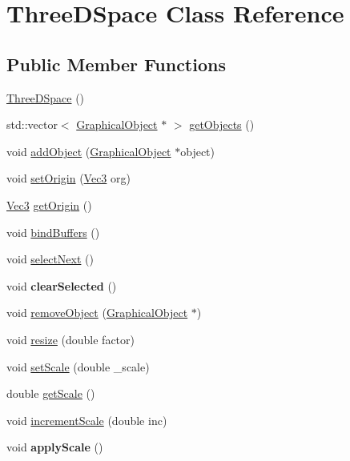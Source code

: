 \hypertarget{classThreeDSpace}{
\section{ThreeDSpace Class Reference}
\label{classThreeDSpace}
}
\subsection*{Public Member Functions}
\begin{DoxyCompactItemize}
\item 
\hyperlink{classThreeDSpace_a28985512b5f94528688add5378ba229f}{ThreeDSpace} ()
\item 
std::vector$<$ \hyperlink{classGraphicalObject}{GraphicalObject} $\ast$ $>$ \hyperlink{classThreeDSpace_a4de0d3a944f860c158082abdc84d68c0}{getObjects} ()
\item 
void \hyperlink{classThreeDSpace_a8d11318f330bd195aa4c750a806652cf}{addObject} (\hyperlink{classGraphicalObject}{GraphicalObject} $\ast$object)
\item 
void \hyperlink{classThreeDSpace_a18f1fc352efe3deb67e41600aa387412}{setOrigin} (\hyperlink{structVec3}{Vec3} org)
\item 
\hyperlink{structVec3}{Vec3} \hyperlink{classThreeDSpace_ab873c63197d94319887fc2117e6ea6d7}{getOrigin} ()
\item 
void \hyperlink{classThreeDSpace_a1d1d309865b74fa140e81038a7ca86da}{bindBuffers} ()
\item 
void \hyperlink{classThreeDSpace_abf4d82956964b5d0b2be43698b7c6031}{selectNext} ()
\item 
\hypertarget{classThreeDSpace_a8b95c261831dc464f3880146a1cfa206}{
void {\bfseries clearSelected} ()}
\label{classThreeDSpace_a8b95c261831dc464f3880146a1cfa206}

\item 
void \hyperlink{classThreeDSpace_a52e5068f7e1281682dee0517101c5d6b}{removeObject} (\hyperlink{classGraphicalObject}{GraphicalObject} $\ast$)
\item 
void \hyperlink{classThreeDSpace_afd5ff33362275de28fa511cf3297364a}{resize} (double factor)
\item 
void \hyperlink{classThreeDSpace_adc71ae34272af523239cc6bb12c79736}{setScale} (double \_\-scale)
\item 
double \hyperlink{classThreeDSpace_a745a1d81d6241615ba25d22dbcdd649a}{getScale} ()
\item 
void \hyperlink{classThreeDSpace_a1e1ea38f8c80cb9a64e6e25bc93f1206}{incrementScale} (double inc)
\item 
\hypertarget{classThreeDSpace_aa7b36f8f31290112a6be9cf43ef4ee33}{
void {\bfseries applyScale} ()}
\label{classThreeDSpace_aa7b36f8f31290112a6be9cf43ef4ee33}

\end{DoxyCompactItemize}
